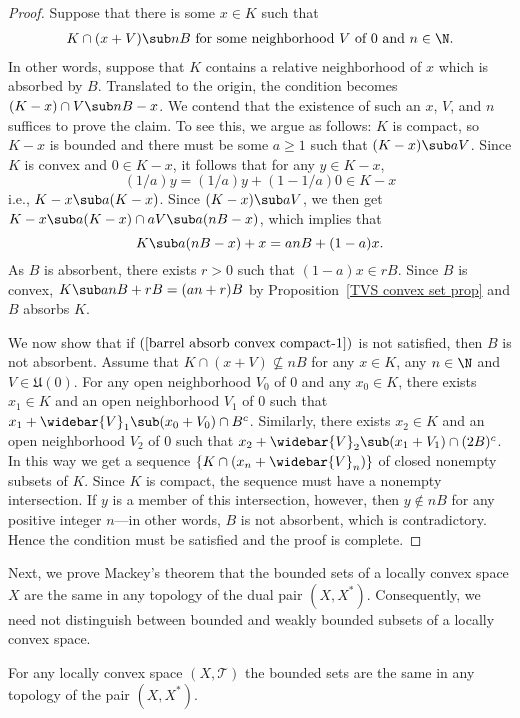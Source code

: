 \begin{proof}
Suppose that there is some $x\in K$ such that
\begin{align}\label{barrel absorb convex compact-1}
K\cap(x+V)\sub nB\text{ for some neighborhood $V$ of $0$ and $n\in\N$}.
\end{align}
In other words, suppose that $K$ contains a relative neighborhood of $x$ which is absorbed by $B$. Translated to the origin, the condition becomes $(K-x)\cap V\sub nB-x$. We contend that the existence of such an $x$, $V$, and $n$ suffices to prove the claim. To see this, we argue as follows: $K$ is compact, so $K-x$ is bounded and there must be some $a\geq 1$ such that $(K-x)\sub aV$. Since $K$ is convex and $0\in K-x$, it follows that for any $y\in K-x$,
\[(1/a)y=(1/a)y+(1-1/a)0\in K-x\]
i.e., $K-x\sub a(K-x)$. Since $(K-x)\sub aV$, we then get $K-x\sub a(K-x)\cap aV\sub a(nB-x)$, which implies that
\[K\sub a(nB-x)+x=anB+(1-a)x.\]
As $B$ is absorbent, there exists $r>0$ such that $(1-a)x\in rB$. Since $B$ is convex, $K\sub anB+rB=(an+r)B$ by Proposition~\ref{TVS convex set prop} and $B$ absorbs $K$.\par
We now show that if $(\ref{barrel absorb convex compact-1})$ is not satisfied, then $B$ is not absorbent. Assume that $K\cap(x+V)\nsubseteq nB$ for any $x\in K$, any $n\in\N$ and $V\in\mathfrak{U}(0)$. For any open neighborhood $V_0$ of $0$ and any $x_0\in K$, there exists $x_1\in K$ and an open neighborhood $V_1$ of $0$ such that $x_1+\widebar{V}_1\sub(x_0+V_0)\cap B^c$. Similarly, there exists $x_2\in K$ and an open neighborhood $V_2$ of $0$ such that $x_2+\widebar{V}_2\sub(x_1+V_1)\cap(2B)^c$. In this way we get a sequence $\{K\cap(x_n+\widebar{V}_n)\}$ of closed nonempty subsets of $K$. Since $K$ is compact, the sequence must have a nonempty intersection. If $y$ is a member of this intersection, however, then $y\notin nB$ for any positive integer $n$---in other words, $B$ is not absorbent, which is contradictory. Hence the condition must be satisfied and the proof is complete.
\end{proof}
Next, we prove Mackey's theorem that the bounded sets of a locally convex space $X$ are the same in any topology of the dual pair $(X,X^*)$. Consequently, we need not distinguish between bounded and weakly bounded subsets of a locally convex space.
\begin{theorem}\label{LCS bounded set permanence}
For any locally convex space $(X,\mathcal{T})$ the bounded sets are the same in any topology of the pair $(X,X^*)$.
\end{theorem}
